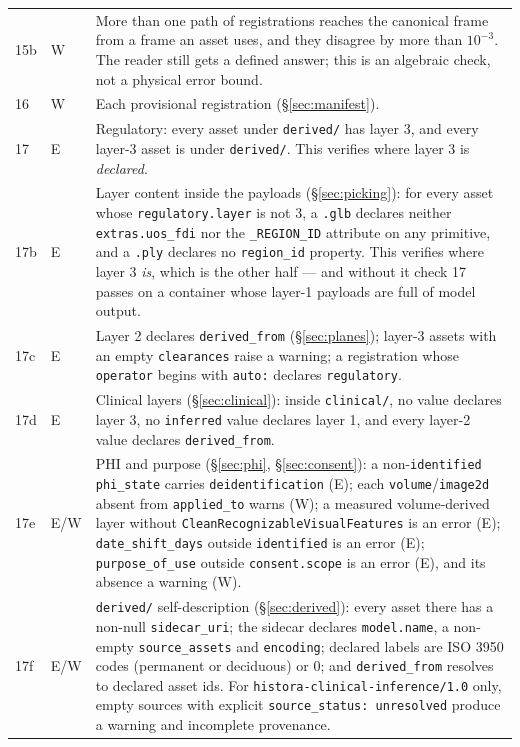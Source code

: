 \documentclass[11pt,a4paper]{article}
\newcommand{\code}[1]{\texttt{\small #1}}
\begin{document}
\begin{longtable}{C{0.8cm} C{0.9cm} L{13.4cm}}
15b & W & More than one path of registrations reaches the canonical frame
from a frame an asset uses, and they disagree by more than $10^{-3}$. The reader still gets
a defined answer; this is an algebraic check, not a physical error bound.\\
16 & W & Each provisional registration (\S\ref{sec:manifest}).\\
17 & E & Regulatory: every asset under \code{derived/} has layer 3, and every layer-3 asset
is under \code{derived/}. This verifies where layer 3 is \emph{declared}.\\
17b & E & Layer content inside the payloads (\S\ref{sec:picking}): for every asset whose
\code{regulatory.layer} is not 3, a \code{.glb} declares neither \code{extras.uos\_fdi} nor
the \code{\_REGION\_ID} attribute on any primitive, and a \code{.ply} declares no
\code{region\_id} property. This verifies where layer 3 \emph{is}, which is the other half
--- and without it check 17 passes on a container whose layer-1 payloads are full of model
output.\\
17c & E & Layer 2 declares \code{derived\_from} (\S\ref{sec:planes}); layer-3 assets with
an empty \code{clearances} raise a warning; a registration whose \code{operator} begins
with \code{auto:} declares \code{regulatory}.\\
17d & E & Clinical layers (\S\ref{sec:clinical}): inside \code{clinical/}, no value
declares layer 3, no \code{inferred} value declares layer 1, and every layer-2 value
declares \code{derived\_from}.\\
17e & E/W & PHI and purpose (\S\ref{sec:phi}, \S\ref{sec:consent}): a non-\code{identified}
\code{phi\_state} carries \code{deidentification} (E); each \code{volume}/\code{image2d}
absent from \code{applied\_to} warns (W); a measured volume-derived layer without
\code{CleanRecognizableVisualFeatures} is an error (E); \code{date\_shift\_days} outside
\code{identified} is an error (E); \code{purpose\_of\_use} outside
\code{consent.scope} is an error (E), and its absence a warning (W).\\
17f & E/W & \code{derived/} self-description (\S\ref{sec:derived}): every asset there has a
non-null \code{sidecar\_uri}; the sidecar declares \code{model.name}, a non-empty
\code{source\_assets} and \code{encoding}; declared labels are ISO 3950 codes (permanent or
deciduous) or 0; and \code{derived\_from} resolves to declared asset ids.
For \code{histora-clinical-inference/1.0} only, empty sources with explicit
\code{source\_status: unresolved} produce a warning and incomplete provenance.\\

\end{longtable}
\end{document}
